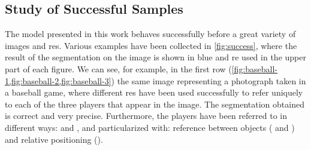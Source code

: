 \subsection{Study of Successful Samples}\label{sec:succesful}

The model presented in this work behaves successfully before a great variety of
images and \glspl{re}. Various examples have been collected in
\vref{fig:success}, where the result of the segmentation on the image is shown
in blue and \gls{re} used in the upper part of each figure. We can see, for
example, in the first row (\vref{fig:baseball-1,fig:baseball-2,fig:baseball-3})
the same image representing a photograph taken in a baseball game, where
different \glspl{re} have been used successfully to refer uniquely to each of
the three players that appear in the image. The segmentation obtained is
correct and very precise. Furthermore, the players have been referred to in
different ways:  and , and particularized with: reference
between objects ( and ) and relative
positioning ().


